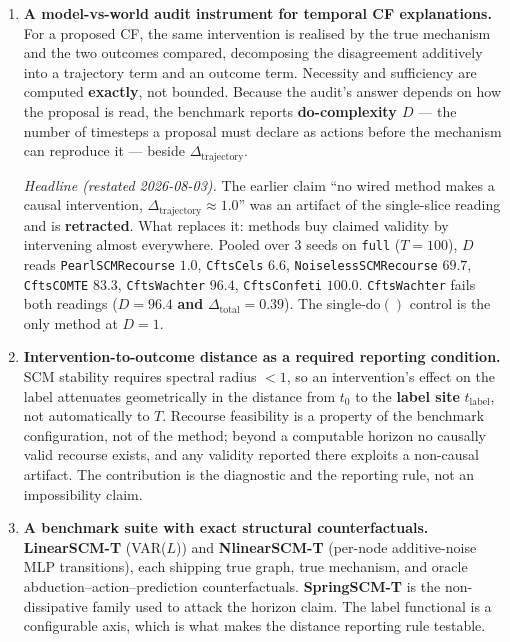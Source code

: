 \documentclass[11pt]{article}
\newcommand{\Deltatotal}{\Delta_{\mathrm{total}}}
\newcommand{\Deltatraj}{\Delta_{\mathrm{trajectory}}}
\begin{document}
\begin{enumerate}[leftmargin=*]
  \item \textbf{A model-vs-world audit instrument for temporal CF
        explanations.} For a proposed CF, the same intervention is
        realised by the true mechanism and the two outcomes compared,
        decomposing the disagreement additively into a trajectory term and
        an outcome term. Necessity and sufficiency are computed
        \textbf{exactly}, not bounded. Because the audit's answer depends
        on how the proposal is read, the benchmark reports
        \textbf{do-complexity $D$} --- the number of timesteps a proposal
        must declare as actions before the mechanism can reproduce it ---
        beside $\Deltatraj$.

        \emph{Headline (restated 2026-08-03).} The earlier claim ``no
        wired method makes a causal intervention,
        $\Deltatraj \approx 1.0$'' was an artifact of the single-slice
        reading and is \textbf{retracted}. What replaces it: methods buy
        claimed validity by intervening almost everywhere. Pooled over 3
        seeds on \texttt{full} ($T = 100$), $D$ reads
        \texttt{PearlSCMRecourse} $\mathbf{1.0}$,
        \texttt{CftsCels} $6.6$,
        \texttt{NoiselessSCMRecourse} $69.7$,
        \texttt{CftsCOMTE} $83.3$,
        \texttt{CftsWachter} $96.4$,
        \texttt{CftsConfeti} $\mathbf{100.0}$.
        \texttt{CftsWachter} fails both readings ($D = 96.4$ \textbf{and}
        $\Deltatotal = 0.39$). The single-$\mathrm{do}()$ control is the
        only method at $D = 1$.

  \item \textbf{Intervention-to-outcome distance as a required reporting
        condition.} SCM stability requires spectral radius $< 1$, so an
        intervention's effect on the label attenuates geometrically in the
        distance from $t_0$ to the \textbf{label site} $t_{\mathrm{label}}$,
        not automatically to $T$. Recourse feasibility is a property of
        the benchmark configuration, not of the method; beyond a
        computable horizon no causally valid recourse exists, and any
        validity reported there exploits a non-causal artifact. The
        contribution is the diagnostic and the reporting rule, not an
        impossibility claim.

  \item \textbf{A benchmark suite with exact structural counterfactuals.}
        \textbf{LinearSCM-T} (VAR($L$)) and \textbf{NlinearSCM-T}
        (per-node additive-noise MLP transitions), each shipping true
        graph, true mechanism, and oracle
        abduction--action--prediction counterfactuals.
        \textbf{SpringSCM-T} is the non-dissipative family used to attack
        the horizon claim. The label functional is a configurable axis,
        which is what makes the distance reporting rule testable.
\end{enumerate}
\end{document}
